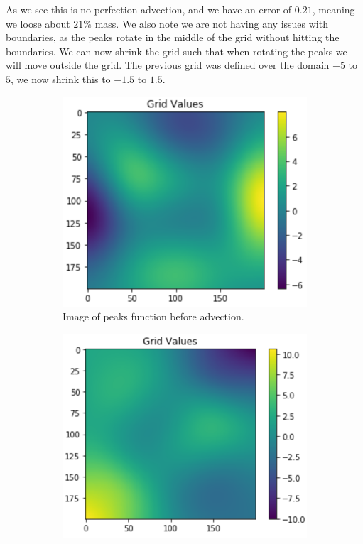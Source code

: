 As we see this is no perfection advection, and we have an error of $0.21$, meaning we loose about $21\%$ mass. We also note we are not having any issues with boundaries, as the peaks rotate in the middle of the grid without hitting the boundaries. We can now shrink the grid such that when rotating the peaks we will move outside the grid. The previous grid was defined over the domain $-5$ to $5$, we now shrink this to $-1.5$ to $1.5$.
\begin{figure}
	\centering
	\begin{subfigure}[b]{0.40\linewidth}
		\centering
		\includegraphics[width=\linewidth]{Materials/Lagrangian/et0}
		\caption{Image of peaks function before advection.}
		\label{et0}
	\end{subfigure}
	\hfill
	\begin{subfigure}[b]{0.40\linewidth}
		\centering
		\includegraphics[width=\linewidth]{Materials/Lagrangian/et1}

\end{subfigure}
\end{figure}
